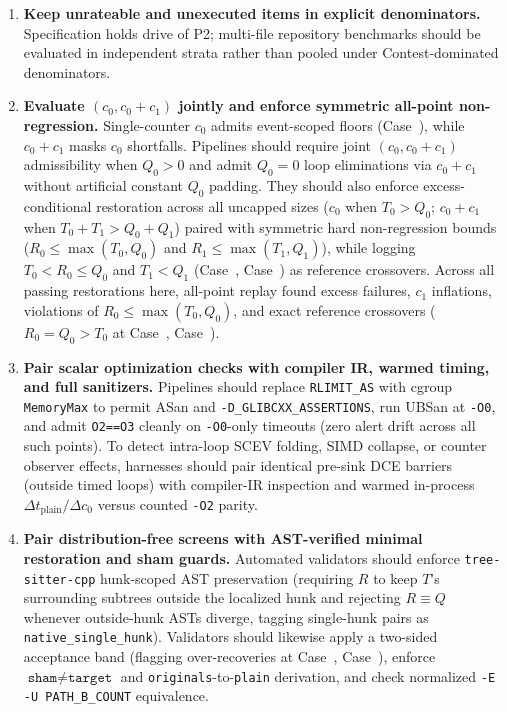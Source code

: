 \documentclass[11pt]{article}
\newcommand{\CaseRef}[1]{Case~#1}
\begin{document}
\begin{enumerate}
\item \textbf{Keep unrateable and unexecuted items in explicit denominators.} Specification holds drive \BenchPTwoHoldsShare{} of P2; multi-file repository benchmarks should be evaluated in independent strata rather than pooled under Contest-dominated denominators.
\item \textbf{Evaluate $(c_0, c_0+c_1)$ jointly and enforce symmetric all-point non-regression.} Single-counter $c_0$ admits event-scoped floors (\CaseRef{\BenchPosOneSixFour{}}), while $c_0+c_1$ masks \BenchRestCOneMaskN{} $c_0$ shortfalls. Pipelines should require joint $(c_0, c_0+c_1)$ admissibility when $Q_0 > 0$ and admit $Q_0 = 0$ loop eliminations via $c_0+c_1$ without artificial constant $Q_0$ padding. They should also enforce excess-conditional restoration across all uncapped sizes ($c_0$ when $T_0>Q_0$; $c_0+c_1$ when $T_0+T_1>Q_0+Q_1$) paired with symmetric hard non-regression bounds ($R_0 \le \max(T_0, Q_0)$ and $R_1 \le \max(T_1, Q_1)$), while logging $T_0 < R_0 \le Q_0$ and $T_1 < Q_1$ (\CaseRef{\BenchPosNineOne{}}, \CaseRef{\BenchPosOneSevenFive{}}) as reference crossovers. Across all \BenchRestFitPassN{} passing restorations here, all-point replay found \BenchAllPtExcessFailN{} excess failures, \BenchAllPtRoneInflN{} $c_1$ inflations, \BenchAllPtMaxBoundFailN{} violations of $R_0 \le \max(T_0, Q_0)$, and \BenchAllPtNonRegFailN{} exact reference crossovers ($R_0 = Q_0 > T_0$ at \CaseRef{\BenchPosEighteen{}}, \CaseRef{\BenchPosFourFour{}}).
\item \textbf{Pair scalar optimization checks with compiler IR, warmed timing, and full sanitizers.} Pipelines should replace \texttt{RLIMIT\_AS} with cgroup \texttt{MemoryMax} to permit ASan and \texttt{-D\_GLIBCXX\_ASSERTIONS}, run UBSan at \texttt{-O0}, and admit \texttt{O2==O3} cleanly on \texttt{-O0}-only timeouts (zero alert drift across all \BenchOZeroRelaxCapPtsN{} such points). To detect intra-loop SCEV folding, SIMD collapse, or counter observer effects, harnesses should pair identical pre-sink DCE barriers (outside timed loops) with compiler-IR inspection and warmed in-process $\Delta t_{\text{plain}}/\Delta c_0$ versus counted \texttt{-O2} parity.
\item \textbf{Pair distribution-free screens with AST-verified minimal restoration and sham guards.} Automated validators should enforce \texttt{tree-sitter-cpp} hunk-scoped AST preservation (requiring $R$ to keep $T$'s surrounding subtrees outside the localized hunk and rejecting $R \equiv Q$ whenever outside-hunk ASTs diverge, tagging single-hunk pairs as \texttt{native\_single\_hunk}). Validators should likewise apply a two-sided \BenchRestTwoSidedBand{} acceptance band (flagging \BenchRestHighBand{} over-recoveries at \CaseRef{\BenchPosNineOne{}}, \CaseRef{\BenchPosOneTwoNine{}}), enforce $\texttt{sham} \neq \texttt{target}$ and \texttt{originals}-to-\texttt{plain} derivation, and check normalized \texttt{-E -U PATH\_B\_COUNT} equivalence.

\end{enumerate}
\end{document}
